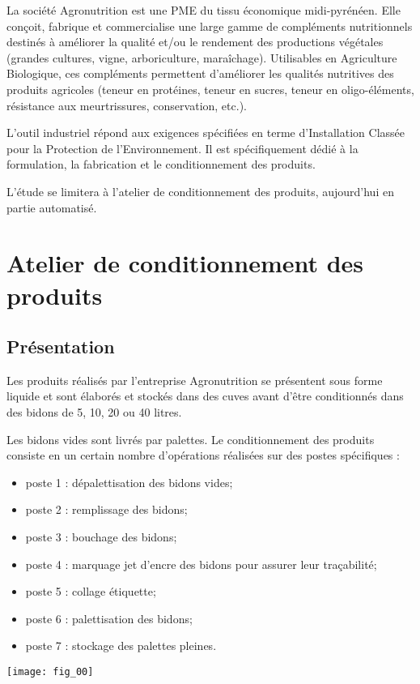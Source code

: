 La société Agronutrition est une PME du tissu économique midi-pyrénéen. Elle conçoit, 
fabrique et commercialise une large gamme de compléments nutritionnels destinés à 
améliorer la qualité et/ou le rendement des productions végétales (grandes cultures, vigne, 
arboriculture, maraîchage). Utilisables en Agriculture Biologique, ces compléments 
permettent d'améliorer les qualités nutritives des produits agricoles (teneur en protéines, 
teneur en sucres, teneur en oligo-éléments, résistance aux meurtrissures, conservation, etc.). 

L’outil industriel répond aux exigences spécifiées en terme d’Installation Classée pour la 
Protection de l’Environnement. Il est spécifiquement dédié à la formulation, la fabrication et 
le conditionnement des produits. 

L’étude se limitera à l’atelier de conditionnement des produits, aujourd’hui en partie 
automatisé.

\section{Atelier de conditionnement des produits}

\subsection{Présentation }
Les produits réalisés par l’entreprise Agronutrition se présentent sous forme liquide et sont 
élaborés et stockés dans des cuves avant d’être conditionnés dans des bidons de 5, 10, 20 ou 
40 litres. 

\vspace{.4cm}
\begin{minipage}[c]{.53\linewidth}
Les bidons vides sont livrés par palettes. Le conditionnement des produits consiste en un 
certain nombre d’opérations réalisées sur des postes spécifiques : 
\begin{itemize}
\item poste 1 : dépalettisation des bidons vides;
\item poste 2 : remplissage des bidons;
\item poste 3 : bouchage des bidons;
\item poste 4 : marquage jet d’encre des bidons pour assurer leur traçabilité;
\item poste 5 : collage étiquette;
\item poste 6 : palettisation des bidons;
\item poste 7 : stockage des palettes pleines. 
\end{itemize}

\end{minipage} \hfill
\begin{minipage}[c]{.45\linewidth}
\begin{center}
\texttt{[image: fig\_00]}
\end{center}
\end{minipage}


